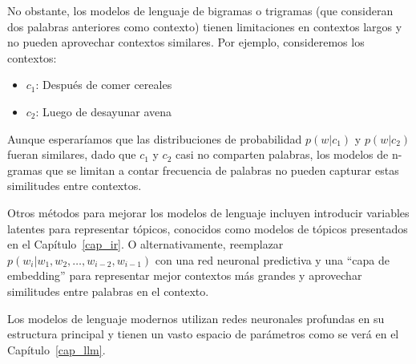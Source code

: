 \documentclass[11pt,fleqn]{book} %
\begin{document}
No obstante, los modelos de lenguaje de bigramas o trigramas (que consideran dos palabras anteriores como contexto) tienen limitaciones en contextos largos y no pueden aprovechar contextos similares. Por ejemplo, consideremos los contextos:
\begin{itemize}
 \item $c_1$: Después de comer cereales
\item  $c_2$: Luego de desayunar avena 
\end{itemize}

Aunque esperaríamos que las distribuciones de probabilidad $p(w|c_1)$ y $p(w|c_2)$ fueran similares, dado que $c_1$ y $c_2$ casi no comparten palabras, los modelos de n-gramas que se limitan a contar frecuencia de palabras no pueden capturar estas similitudes entre contextos.
    
    
Otros métodos para mejorar los modelos de lenguaje incluyen introducir variables latentes para representar tópicos, conocidos como modelos de tópicos \cite{blei2003latent} presentados en el Capítulo~\ref{cap_ir}. O alternativamente, reemplazar $p(w_i | w_1, w_2, \ldots, w_{i-2}, w_{i-1})$ con una red neuronal predictiva y una ``capa de embedding'' para representar mejor contextos más grandes y aprovechar similitudes entre palabras en el contexto. \cite{bengio2000neural}

Los modelos de lenguaje modernos utilizan redes neuronales profundas en su estructura principal y tienen un vasto espacio de parámetros como se verá en el Capítulo~\ref{cap_llm}.




\end{document}

